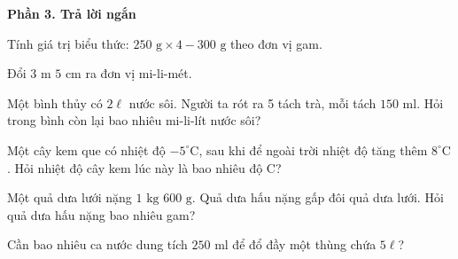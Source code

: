 \textbf{Phần 3. Trả lời ngắn}

\begin{ex} %
Tính giá trị biểu thức: $250\text{ g} \times 4 - 300\text{ g}$ theo đơn vị gam.
\end{ex}

\begin{ex} %
Đổi $3\text{ m } 5\text{ cm}$ ra đơn vị mi-li-mét.
\end{ex}

\begin{ex} %
Một bình thủy có $2\ell$ nước sôi. Người ta rót ra 5 tách trà, mỗi tách $150\text{ ml}$. Hỏi trong bình còn lại bao nhiêu mi-li-lít nước sôi?
\end{ex}

\begin{ex} %
Một cây kem que có nhiệt độ $-5^\circ\text{C}$, sau khi để ngoài trời nhiệt độ tăng thêm $8^\circ\text{C}$. Hỏi nhiệt độ cây kem lúc này là bao nhiêu độ C?
\end{ex}

\begin{ex} %
Một quả dưa lưới nặng $1\text{ kg } 600\text{ g}$. Quả dưa hấu nặng gấp đôi quả dưa lưới. Hỏi quả dưa hấu nặng bao nhiêu gam?
\end{ex}

\begin{ex} %
Cần bao nhiêu ca nước dung tích $250\text{ ml}$ để đổ đầy một thùng chứa $5\ell$?
\end{ex}
